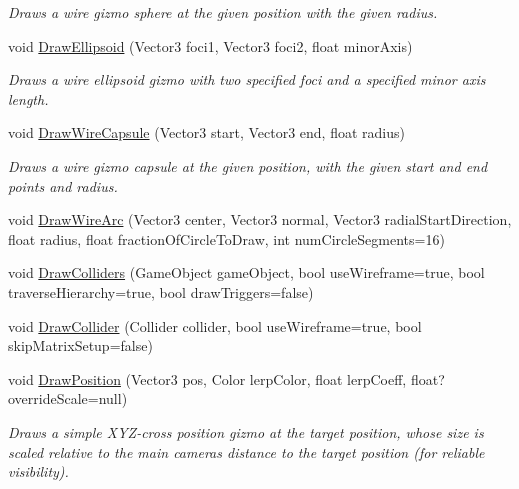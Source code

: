 \begin{DoxyCompactItemize}
\begin{DoxyCompactList}\small\item\em Draws a wire gizmo sphere at the given position with the given radius. \end{DoxyCompactList}\item 
void \mbox{\hyperlink{class_leap_1_1_unity_1_1_runtime_gizmos_1_1_runtime_gizmo_drawer_ace421278133ab90a03ed16b9016778f0}{Draw\+Ellipsoid}} (Vector3 foci1, Vector3 foci2, float minor\+Axis)
\begin{DoxyCompactList}\small\item\em Draws a wire ellipsoid gizmo with two specified foci and a specified minor axis length. \end{DoxyCompactList}\item 
void \mbox{\hyperlink{class_leap_1_1_unity_1_1_runtime_gizmos_1_1_runtime_gizmo_drawer_a42b99c3009d495968bde636b7a88ea23}{Draw\+Wire\+Capsule}} (Vector3 start, Vector3 end, float radius)
\begin{DoxyCompactList}\small\item\em Draws a wire gizmo capsule at the given position, with the given start and end points and radius. \end{DoxyCompactList}\item 
void \mbox{\hyperlink{class_leap_1_1_unity_1_1_runtime_gizmos_1_1_runtime_gizmo_drawer_a03a1f0a8e07e77a5d33cbd11efd7066e}{Draw\+Wire\+Arc}} (Vector3 center, Vector3 normal, Vector3 radial\+Start\+Direction, float radius, float fraction\+Of\+Circle\+To\+Draw, int num\+Circle\+Segments=16)
\item 
void \mbox{\hyperlink{class_leap_1_1_unity_1_1_runtime_gizmos_1_1_runtime_gizmo_drawer_a16bef61806ee819707718cf4f347cd29}{Draw\+Colliders}} (Game\+Object game\+Object, bool use\+Wireframe=true, bool traverse\+Hierarchy=true, bool draw\+Triggers=false)
\item 
void \mbox{\hyperlink{class_leap_1_1_unity_1_1_runtime_gizmos_1_1_runtime_gizmo_drawer_a4f7c328555af1aa997feb8eca14639e3}{Draw\+Collider}} (Collider collider, bool use\+Wireframe=true, bool skip\+Matrix\+Setup=false)
\item 
void \mbox{\hyperlink{class_leap_1_1_unity_1_1_runtime_gizmos_1_1_runtime_gizmo_drawer_afdee9da9941fbd020b25ef9c0ee2b73b}{Draw\+Position}} (Vector3 pos, Color lerp\+Color, float lerp\+Coeff, float? override\+Scale=null)
\begin{DoxyCompactList}\small\item\em Draws a simple X\+Y\+Z-\/cross position gizmo at the target position, whose size is scaled relative to the main camera\textquotesingle{}s distance to the target position (for reliable visibility). \end{DoxyCompactList}\item 

\end{DoxyCompactItemize}
